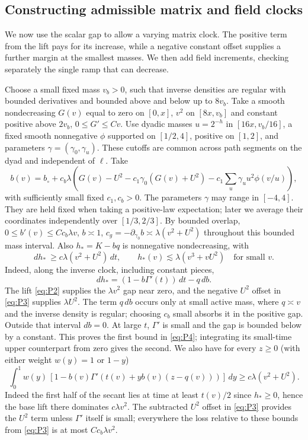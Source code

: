 \subsection{Constructing admissible matrix and field clocks}

We now use the scalar gap to allow a varying matrix clock. The positive
term from the lift pays for its increase, while a negative constant
offset supplies a further margin at the smallest masses. We then add
field increments, checking separately the single ramp that can decrease.

Choose a small fixed mass \(v_b>0\), such that inverse densities are regular with bounded derivatives and bounded above and below up to \(8v_b\). Take a smooth nondecreasing \(G(v)\) equal to zero on \([0,x]\), \(v^2\) on \([8x,v_b]\) and constant positive above \(2v_b\), \(0\le G'\le C v\). Use dyadic masses \(u=2^{-h}\) in \([16x,v_b/16]\), a fixed smooth nonnegative \(\phi\) supported on \([1/2,4]\), positive on \([1,2]\), and parameters \(\gamma=(\gamma_0,\gamma_u)\). These cutoffs are common across path segments on the dyad and independent of \(\ell\). Take
\[
 b(v)=b_\circ+c_b\lambda\left(G(v)-U^2-c_1\gamma_0(G(v)+U^2)
                     -c_1\sum_u\gamma_u u^2\phi(v/u)\right),              \tag{P3}\label{eq:P3}
\]
with sufficiently small fixed \(c_1,c_b>0\). The parameters \(\gamma\) may range in \([-4,4]\). They are held fixed
when taking a positive-law expectation; later we average their coordinates
independently over \([1/3,2/3]\). By bounded overlap, \(0\le b'(v)\le Cc_b\lambda v\), \(b\asymp1\), \(c_g=-\partial_{\gamma_0}b\asymp\lambda(v^2+U^2)\) throughout this bounded mass interval. Also \(h_*=K-bq\) is nonnegative nondecreasing, with
\[
 dh_*\ \ge c\lambda(v^2+U^2)\,dt,\qquad
 h_*(v)\lesssim\lambda(v^3+vU^2)\quad\text{for small }v .              \tag{P4}\label{eq:P4}
\]
Indeed, along the inverse clock, including constant pieces,
\[
 dh_*=(1-b\Gamma'(t))\,dt-q\,db.
\]
The lift \eqref{eq:P2} supplies the \(\lambda v^2\) gap near zero,
and the negative \(U^2\) offset in \eqref{eq:P3} supplies
\(\lambda U^2\). The term \(q\,db\) occurs only at small active
mass, where \(q\asymp v\) and the inverse density is regular; choosing
\(c_b\) small absorbs it in the positive gap. Outside that interval
\(db=0\). At large \(t\), \(\Gamma'\) is small and the gap is
bounded below by a constant. This proves the first bound in
\eqref{eq:P4}; integrating its small-time upper counterpart from zero
gives the second. We also have for every \(z\ge0\) (with either weight \(w(y)=1\) or \(1-y\))
\[
 \int_0^1 w(y)\,[1-b(v)\Gamma'(t(v)+y b(v)(z-q(v)))]\,dy
           \ge c\lambda(v^2+U^2).                                        \tag{P5}\label{eq:P5}
\]
Indeed the first half of the secant lies at time at least \(t(v)/2\) since \(h_*\ge0\), hence the base lift there dominates \(c\lambda v^2\). The subtracted \(U^2\) offset in \eqref{eq:P3} provides the \(U^2\) term unless \(\Gamma'\) itself is small; everywhere the loss relative to these bounds from \eqref{eq:P3} is at most \(C c_b\lambda v^2\).

